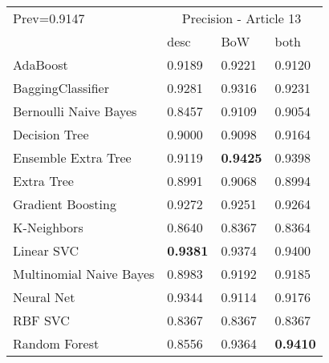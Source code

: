 \begin{tabular}{|l|l|l|l| }
\hline
Prev=0.9147 &  \multicolumn{3}{c|}{Precision - Article 13} \\
\cline{2-4} & desc & BoW & both \\ \hline
AdaBoost                & 0.9189 & 0.9221 & 0.9120\\
BaggingClassifier       & 0.9281 & 0.9316 & 0.9231\\
Bernoulli Naive Bayes   & 0.8457 & 0.9109 & 0.9054\\
Decision Tree           & 0.9000 & 0.9098 & 0.9164\\
Ensemble Extra Tree     & 0.9119 & {\bf 0.9425} & 0.9398\\
Extra Tree              & 0.8991 & 0.9068 & 0.8994\\
Gradient Boosting       & 0.9272 & 0.9251 & 0.9264\\
K-Neighbors             & 0.8640 & 0.8367 & 0.8364\\
Linear SVC              & {\bf 0.9381} & 0.9374 & 0.9400\\
Multinomial Naive Bayes & 0.8983 & 0.9192 & 0.9185\\
Neural Net              & 0.9344 & 0.9114 & 0.9176\\
RBF SVC                 & 0.8367 & 0.8367 & 0.8367\\
Random Forest           & 0.8556 & 0.9364 & {\bf 0.9410}\\
\hline
\end{tabular}